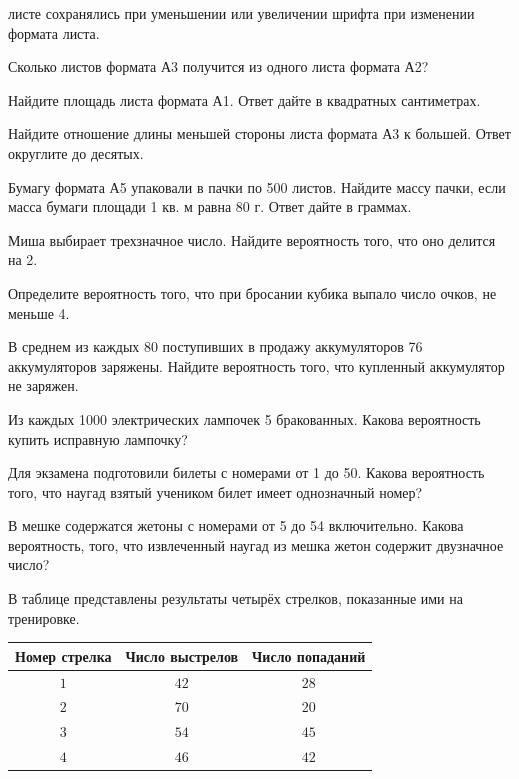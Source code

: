 \begin{class}[number=4]
\begin{listofex}
		листе сохранялись при уменьшении или увеличении шрифта при изменении формата листа.
		\item Сколько листов формата А3 получится из одного листа формата А2?
		\item Найдите площадь листа формата А1. Ответ дайте в квадратных сантиметрах.
		\item Найдите отношение длины меньшей стороны листа формата А3 к большей. Ответ округлите до
		десятых.
		\item Бумагу формата А5 упаковали в пачки по 500 листов. Найдите массу пачки, если масса бумаги
		площади 1 кв. м равна 80 г. Ответ дайте в граммах.
		\item Миша выбирает трехзначное число. Найдите вероятность того, что оно делится на 2.
		\item Определите вероятность того, что при бросании кубика выпало число очков, не меньше 4.
		\item В среднем из каждых 80 поступивших в продажу аккумуляторов 76 аккумуляторов заряжены. Найдите вероятность того, что купленный аккумулятор не заряжен.
		\item Из каждых 1000 электрических лампочек 5 бракованных. Какова вероятность купить исправную лампочку?
		\item Для экзамена подготовили билеты с номерами от 1 до 50. Какова вероятность того, что наугад взятый учеником билет имеет однозначный номер?
		\item В мешке содержатся жетоны с номерами от 5 до 54 включительно. Какова вероятность, того, что извлеченный наугад из мешка жетон содержит двузначное число?
		\item В таблице представлены результаты четырёх стрелков, показанные ими на тренировке.
		\begin{center}
			\footnotesize
			\begin{tabular}{|c|c|c|}
				\hline
				\rowcolor{gray}\textbf{Номер стрелка}&\textbf{Число выстрелов}&\textbf{Число попаданий}\\
				\hline
				\( 1 \)&\( 42 \)&\( 28 \)\\
				\hline
				\( 2 \)&\( 70 \)&\( 20 \)\\
				\hline
				\( 3 \)&\( 54 \)&\( 45 \)\\
				\hline
				\( 4 \)&\( 46 \)&\( 42 \)\\
				\hline
			\end{tabular}
		\end{center}
		

\end{listofex}
\end{class}
